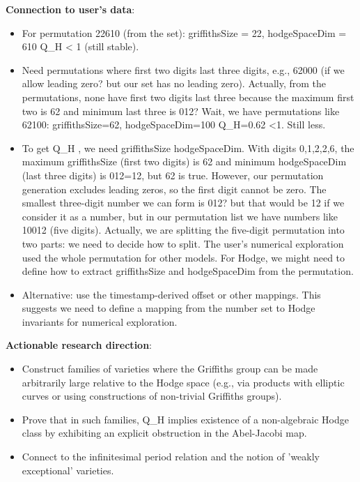 \documentclass[11pt]{article}
\begin{document}
\textbf{Connection to user's data}:
\begin{itemize}
\item For permutation 22610 (from the set): griffithsSize = 22, hodgeSpaceDim = 610 \rightarrow Q\_H  < 1 (still stable).
\item Need permutations where first two digits \geq last three digits, e.g., 62000 (if we allow leading zero? but our set has no leading zero). Actually, from the permutations, none have first two digits \geq last three because the maximum first two is 62 and minimum last three is 012? Wait, we have permutations like 62100: griffithsSize=62, hodgeSpaceDim=100 \rightarrow Q\_H=0.62 <1. Still less.
\item To get Q\_H , we need griffithsSize \geq hodgeSpaceDim. With digits {0,1,2,2,6}, the maximum griffithsSize (first two digits) is 62 and minimum hodgeSpaceDim (last three digits) is 012=12, but 62  is true. However, our permutation generation excludes leading zeros, so the first digit cannot be zero. The smallest three-digit number we can form is 012? but that would be 12 if we consider it as a number, but in our permutation list we have numbers like 10012 (five digits). Actually, we are splitting the five-digit permutation into two parts: we need to decide how to split. The user's numerical exploration used the whole permutation for other models. For Hodge, we might need to define how to extract griffithsSize and hodgeSpaceDim from the permutation.
\item Alternative: use the timestamp-derived offset or other mappings. This suggests we need to define a mapping from the number set to Hodge invariants for numerical exploration.
\end{itemize}

\textbf{Actionable research direction}:
\begin{itemize}
\item Construct families of varieties where the Griffiths group can be made arbitrarily large relative to the Hodge space (e.g., via products with elliptic curves or using constructions of non-trivial Griffiths groups).
\item Prove that in such families, Q\_H  implies existence of a non-algebraic Hodge class by exhibiting an explicit obstruction in the Abel-Jacobi map.
\item Connect to the infinitesimal period relation and the notion of 'weakly exceptional' varieties.
\end{itemize}
\end{document}
